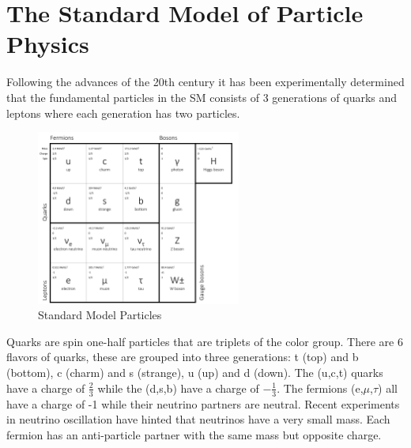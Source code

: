 
\section{The Standard Model of Particle Physics}%
\label{sec:SMSection}
Following the advances of the 20th century it has been experimentally 
determined that the fundamental
particles in the SM consists of 3 generations of quarks and leptons
where each generation has two particles. 
\begin{figure}[hb]
  \centering
	\includegraphics[width=0.6\textwidth]{images/SMParticles2.png}
  	\caption[SM Particles]
   	{Standard Model Particles}
	\label{fig:SMParticles}
\end{figure}
Quarks are spin one-half particles that are triplets of the color group. 
There are 6 flavors of quarks, these are grouped into three generations:
t (top) and b (bottom), c (charm) and s (strange), u (up) and d (down). 
The (u,c,t) quarks have a charge of $\frac{2}{3}$ while the (d,s,b) have 
a charge of $-\frac{1}{3}$.
The fermions (e,$\mu$,$\tau$) all have a charge of -1 while their neutrino 
partners are neutral. Recent experiments in neutrino oscillation have hinted
that neutrinos have a very small mass.
Each fermion has an anti-particle partner with the same mass but opposite charge.

